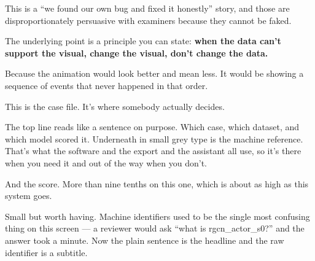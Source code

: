 \documentclass[11pt]{article}
\begin{document}
\begin{means}
This is a ``we found our own bug and fixed it honestly'' story, and those are
disproportionately persuasive with examiners because they cannot be faked.

The underlying point is a principle you can state: \textbf{when the data can't
support the visual, change the visual, don't change the data.}
\end{means}

\begin{asked}
 Because the animation
would look better and mean less. It would be showing a sequence of events that
never happened in that order.
\end{asked}



\begin{saythis}
This is the case file. It's where somebody actually decides.

The top line reads like a sentence on purpose. Which case, which dataset, and
which model scored it. Underneath in small grey type is the machine reference.
That's what the software and the export and the assistant all use, so it's
there when you need it and out of the way when you don't.

And the score. More than nine tenths on this one, which is about as high as
this system goes.
\end{saythis}

\begin{means}
Small but worth having. Machine identifiers used to be the single most
confusing thing on this screen --- a reviewer would ask ``what is
rgcn\_actor\_s0?'' and the answer took a minute. Now the plain sentence is the
headline and the raw identifier is a subtitle.
\end{means}

\end{document}
